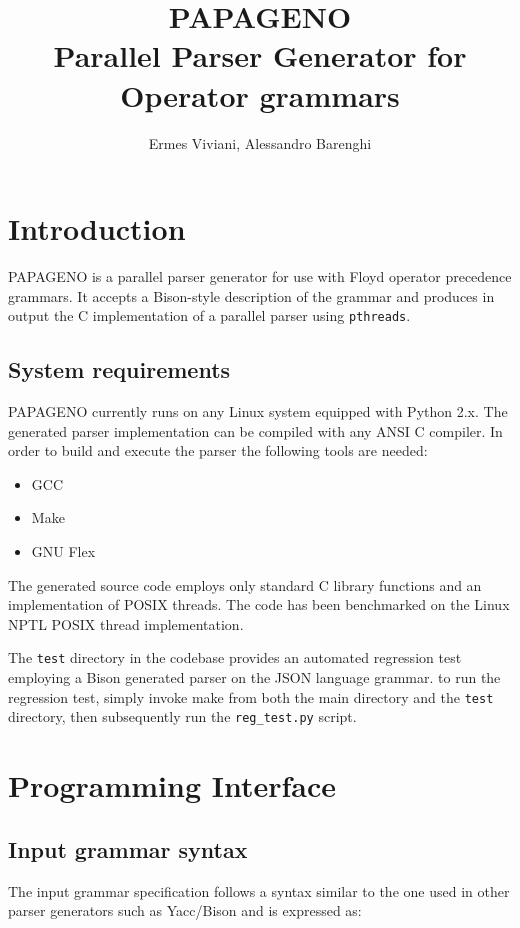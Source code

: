 \documentclass[a4paper,10pt]{article}
\title{PAPAGENO\\ Parallel Parser Generator for Operator grammars}
\author{Ermes Viviani, Alessandro Barenghi}
\begin{document}
\maketitle

\section{Introduction}
PAPAGENO is a parallel parser generator for use with Floyd operator precedence
grammars. It accepts a Bison-style description of the grammar and produces in 
output the C implementation of a parallel parser using \texttt{pthreads}.

\subsection{System requirements}

PAPAGENO currently runs on any Linux system equipped with Python 2.x.
The generated parser implementation can be compiled with any ANSI C compiler.
In order to build and execute the parser the following tools are needed:
\begin{itemize}
 \item GCC 
 \item Make
 \item GNU Flex
\end{itemize}

The generated source code employs only standard C library functions and an implementation of POSIX threads.
The code has been benchmarked on the Linux NPTL POSIX thread implementation.

The \texttt{test} directory in the codebase provides an automated regression test employing a Bison generated parser on the JSON language grammar.
to run the regression test, simply invoke make from both the main directory and the \texttt{test} directory, then subsequently run the \texttt{reg\_test.py} script.


\section{Programming Interface}

\subsection{Input grammar syntax}

The input grammar specification follows a syntax similar to the one used in
other parser generators such as Yacc/Bison and is expressed as:
\end{document}
